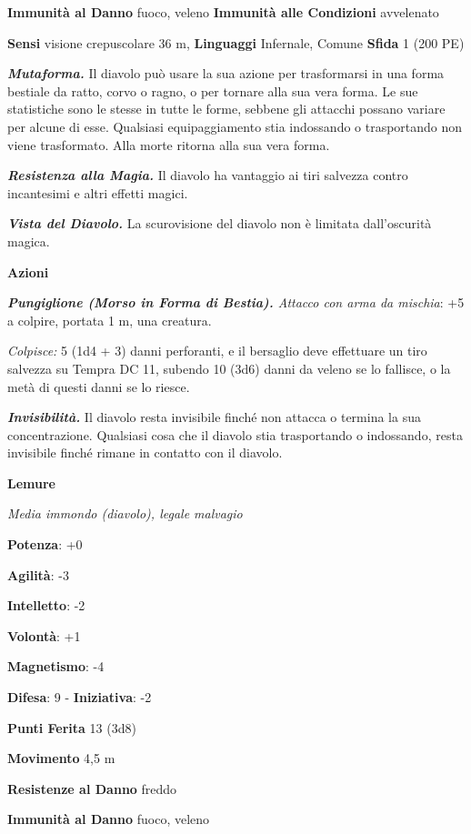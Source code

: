 \begin{multicols}{2}
\textbf{Immunità al Danno} fuoco, veleno \textbf{Immunità alle
Condizioni} avvelenato

\textbf{Sensi} visione crepuscolare 36 m, 
\textbf{Linguaggi} Infernale, Comune \textbf{Sfida} 1 (200 PE)\smallskip

\emph{\textbf{Mutaforma.}} Il diavolo può usare la sua azione per
trasformarsi in una forma bestiale da ratto, corvo o ragno, o per
tornare alla sua vera forma. Le sue statistiche sono le stesse in tutte
le forme, sebbene gli attacchi possano variare per alcune di esse.
Qualsiasi equipaggiamento stia indossando o trasportando non viene
trasformato. Alla morte ritorna alla sua vera forma.

\emph{\textbf{Resistenza alla Magia.}} Il diavolo ha vantaggio ai tiri
salvezza contro incantesimi e altri effetti magici.

\emph{\textbf{Vista del Diavolo.}} La scurovisione del diavolo non è
limitata dall'oscurità magica.

\smallskip\textbf{Azioni}

\emph{\textbf{Pungiglione (Morso in Forma di Bestia).} Attacco con arma
da mischia}: +5 a colpire, portata 1 m, una creatura.

\emph{Colpisce:} 5 (1d4 + 3) danni perforanti, e il bersaglio deve
effettuare un tiro salvezza su Tempra DC 11, subendo 10 (3d6)
danni da veleno se lo fallisce, o la metà di questi danni se lo riesce.

\emph{\textbf{Invisibilità.}} Il diavolo resta invisibile finché non
attacca o termina la sua concentrazione. Qualsiasi cosa che il diavolo
stia trasportando o indossando, resta invisibile finché rimane in
contatto con il diavolo.

\textbf{Lemure}

\emph{Media immondo (diavolo), legale malvagio}

\textbf{Potenza}: +0

\textbf{Agilità}: -3

\textbf{Intelletto}: -2

\textbf{Volontà}: +1

\textbf{Magnetismo}: -4

\textbf{Difesa}: 9 - \textbf{Iniziativa}: -2

\textbf{Punti Ferita} 13 (3d8)

\textbf{Movimento} 4,5 m

\textbf{Resistenze al Danno} freddo

\textbf{Immunità al Danno} fuoco, veleno


\end{multicols}
